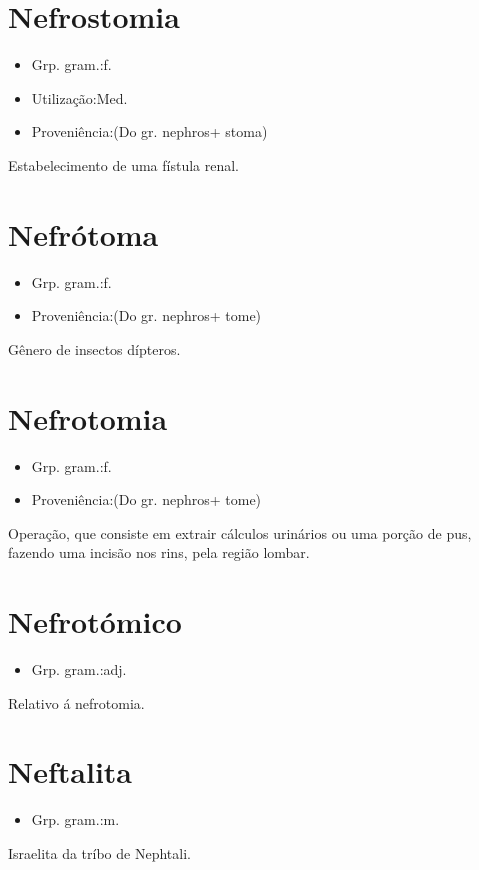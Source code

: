 \section{Nefrostomia}
\begin{itemize}
\item {Grp. gram.:f.}
\end{itemize}
\begin{itemize}
\item {Utilização:Med.}
\end{itemize}
\begin{itemize}
\item {Proveniência:(Do gr. \textunderscore nephros\textunderscore  + \textunderscore stoma\textunderscore )}
\end{itemize}
Estabelecimento de uma fístula renal.
\section{Nefrótoma}
\begin{itemize}
\item {Grp. gram.:f.}
\end{itemize}
\begin{itemize}
\item {Proveniência:(Do gr. \textunderscore nephros\textunderscore  + \textunderscore tome\textunderscore )}
\end{itemize}
Gênero de insectos dípteros.
\section{Nefrotomia}
\begin{itemize}
\item {Grp. gram.:f.}
\end{itemize}
\begin{itemize}
\item {Proveniência:(Do gr. \textunderscore nephros\textunderscore  + \textunderscore tome\textunderscore )}
\end{itemize}
Operação, que consiste em extrair cálculos urinários ou uma porção de pus, fazendo uma incisão nos rins, pela região lombar.
\section{Nefrotómico}
\begin{itemize}
\item {Grp. gram.:adj.}
\end{itemize}
Relativo á nefrotomia.
\section{Neftalita}
\begin{itemize}
\item {Grp. gram.:m.}
\end{itemize}
Israelita da tríbo de Nephtali.
